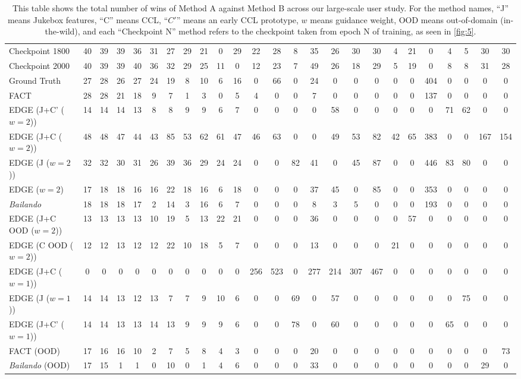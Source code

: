 \begin{table}[t]
{\begin{tabular}{lcccccccccccccccccccccccc}
    Checkpoint 1800 & 40 & 39 & 39 & 36 & 31 & 27 & 29 & 21 & 0 & 29 & 22 & 28 & 8 & 35 & 26 & 30 & 30 & 4 & 21 & 0 & 4 & 5 & 30 & 30 \\
    Checkpoint 2000 & 40 & 39 & 39 & 40 & 36 & 32 & 29 & 25 & 11 & 0 & 12 & 23 & 7 & 49 & 26 & 18 & 29 & 5 & 19 & 0 & 8 & 8 & 31 & 28 \\
    Ground Truth & 27 & 28 & 26 & 27 & 24 & 19 & 8 & 10 & 6 & 16 & 0 & 66 & 0 & 24 & 0 & 0 & 0 & 0 & 0 & 404 & 0 & 0 & 0 & 0 \\
    FACT & 28 & 28 & 21 & 18 & 9 & 7 & 1 & 3 & 0 & 5 & 4 & 0 & 0 & 7 & 0 & 0 & 0 & 0 & 0 & 137 & 0 & 0 & 0 & 0 \\
    EDGE (J+C' ($w=2$)) & 14 & 14 & 14 & 13 & 8 & 8 & 9 & 9 & 6 & 7 & 0 & 0 & 0 & 0 & 58 & 0 & 0 & 0 & 0 & 0 & 71 & 62 & 0 & 0 \\
    EDGE (J+C ($w=2$)) & 48 & 48 & 47 & 44 & 43 & 85 & 53 & 62 & 61 & 47 & 46 & 63 & 0 & 0 & 49 & 53 & 82 & 42 & 65 & 383 & 0 & 0 & 167 & 154 \\
    EDGE (J ($w=2$)) & 32 & 32 & 30 & 31 & 26 & 39 & 36 & 29 & 24 & 24 & 0 & 0 & 82 & 41 & 0 & 45 & 87 & 0 & 0 & 446 & 83 & 80 & 0 & 0 \\
    EDGE ($w=2$) & 17 & 18 & 18 & 16 & 16 & 22 & 18 & 16 & 6 & 18 & 0 & 0 & 0 & 37 & 45 & 0 & 85 & 0 & 0 & 353 & 0 & 0 & 0 & 0 \\
    \textit{Bailando} & 18 & 18 & 18 & 17 & 2 & 14 & 3 & 16 & 6 & 7 & 0 & 0 & 0 & 8 & 3 & 5 & 0 & 0 & 0 & 193 & 0 & 0 & 0 & 0 \\
    EDGE (J+C OOD ($w=2$)) & 13 & 13 & 13 & 13 & 10 & 19 & 5 & 13 & 22 & 21 & 0 & 0 & 0 & 36 & 0 & 0 & 0 & 0 & 57 & 0 & 0 & 0 & 0 & 0 \\
    EDGE (C OOD ($w=2$)) & 12 & 12 & 13 & 12 & 12 & 22 & 10 & 18 & 5 & 7 & 0 & 0 & 0 & 13 & 0 & 0 & 0 & 21 & 0 & 0 & 0 & 0 & 0 & 0 \\
    EDGE (J+C ($w=1$)) & 0 & 0 & 0 & 0 & 0 & 0 & 0 & 0 & 0 & 0 & 256 & 523 & 0 & 277 & 214 & 307 & 467 & 0 & 0 & 0 & 0 & 0 & 0 & 0 \\
    EDGE (J ($w=1$)) & 14 & 14 & 13 & 12 & 13 & 7 & 7 & 9 & 10 & 6 & 0 & 0 & 69 & 0 & 57 & 0 & 0 & 0 & 0 & 0 & 0 & 75 & 0 & 0 \\
    EDGE (J+C' ($w=1$)) & 14 & 14 & 13 & 13 & 14 & 13 & 9 & 9 & 9 & 6 & 0 & 0 & 78 & 0 & 60 & 0 & 0 & 0 & 0 & 0 & 65 & 0 & 0 & 0 \\
    FACT (OOD) & 17 & 16 & 16 & 10 & 2 & 7 & 5 & 8 & 4 & 3 & 0 & 0 & 0 & 20 & 0 & 0 & 0 & 0 & 0 & 0 & 0 & 0 & 0 & 73 \\
    \textit{Bailando} (OOD) & 17 & 15 & 1 & 1 & 0 & 10 & 0 & 1 & 4 & 6 & 0 & 0 & 0 & 33 & 0 & 0 & 0 & 0 & 0 & 0 & 0 & 0 & 29 & 0 \\
    \bottomrule
\end{tabular}}
\caption{This table shows the total number of wins of Method A against Method B across our large-scale user study. For the method names, ``J'' means Jukebox features, ``C'' means CCL, ``$C'$'' means an early CCL prototype, $w$ means guidance weight, OOD means out-of-domain (in-the-wild), and each ``Checkpoint N'' method refers to the checkpoint taken from epoch N of training, as seen in \cref{fig:5}.}
\label{tab:win_table}
\end{table}

